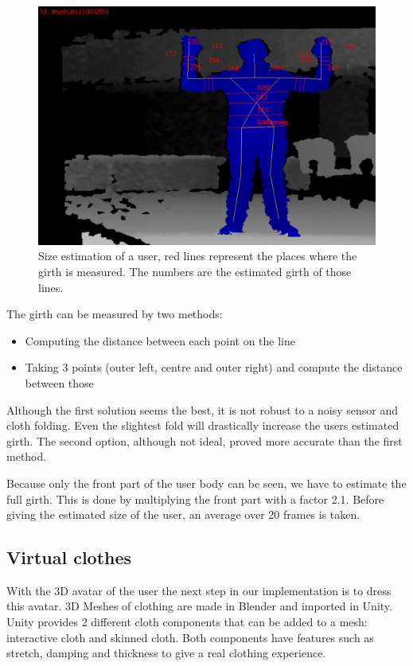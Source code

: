 \documentclass[twocolumn,a4paper]{article}
\begin{document}
\begin{figure}[htp]
\centering
\includegraphics[scale=0.4]{size_estimation.png} 
\caption{Size estimation of a user, red lines represent the places where the girth is measured. The numbers are the estimated girth of those lines.}
\label{fig:size_estimation}
\end{figure}

The girth can be measured by two methods:
\begin{itemize}
\item Computing the distance between each point on the line
\item Taking 3 points (outer left, centre and outer right) and compute the distance between those
\end{itemize}
Although the first solution seems the best, it is not robust to a noisy sensor and cloth folding. Even the slightest fold will drastically increase the users estimated girth.
The second option, although not ideal, proved more accurate than the first method.

Because only the front part of the user body can be seen, we have to estimate the full girth. This is done by multiplying the front part with a factor 2.1. Before giving the estimated size of the user, an average over 20 frames is taken.


\subsection{Virtual clothes}
\label{sec:virtual_clothes}
With the 3D avatar of the user the next step in our implementation is to dress this avatar. 3D Meshes of clothing are made in Blender and imported in Unity. Unity provides 2 different cloth components that can be added to a mesh: interactive cloth and skinned cloth. Both components have features such as stretch, damping and thickness to give a real clothing experience.
\end{document}
